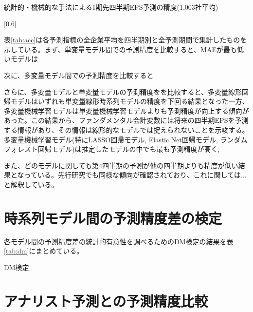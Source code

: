 \documentclass[a4paper, 12pt]{jsarticle}
\begin{document}
\begin{landscape}
\begin{table}
  \caption{統計的・機械的な手法による1期先四半期EPS予測の精度(1,003社平均)}
  \label{tab:acc}
  \scalebox{0.6}[0.6]{
    
  }
\end{table}
\end{landscape}

表\ref{tab:acc}は各予測指標の全企業平均を四半期別と全予測期間で集計したものを示している。まず、単変量モデル間での予測精度を比較すると、MAEが最も低いモデルは

次に、多変量モデル間での予測精度を比較すると

さらに、多変量モデルと単変量モデルの予測精度をを比較すると、多変量線形回帰モデルはいずれも単変量線形時系列モデルの精度を下回る結果となった一方、多変量機械学習モデルは単変量機械学習モデルよりも予測精度が向上する傾向があった。この結果から、ファンダメンタル会計変数には将来の四半期EPSを予測する情報があり、その情報は線形的なモデルでは捉えられないことを示唆する。多変量機械学習モデル(特にLASSO回帰モデル, Elastic Net回帰モデル, ランダムフォレスト回帰モデル)は推定したモデルの中でも最も予測精度が高く, 


また、どのモデルに関しても第4四半期の予測が他の四半期よりも精度が低い結果となっている。先行研究\citep{}でも同様な傾向が確認されており、これに関して\cite{sakurai1990}は...と解釈している。

\section{時系列モデル間の予測精度差の検定}

各モデル間の予測精度差の統計的有意性を調べるためのDM検定の結果を表\ref{tab:dm}にまとめている。

\begin{landscape}
\begin{table}
    \caption{DM検定}
    \label{tab:dm}
\end{table}
\end{landscape}

\section{アナリスト予測との予測精度比較}
\end{document}
